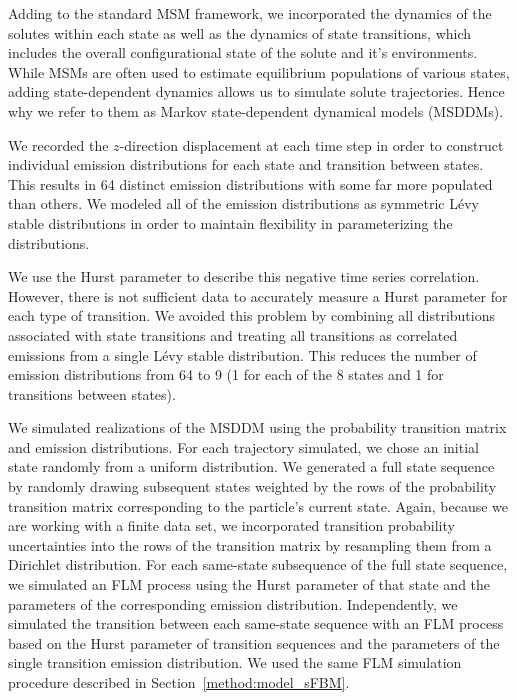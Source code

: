 \documentclass[aps,pre,preprint,groupedaddress,longbibliography]{revtex4-2}
\begin{document}
  Adding to the standard MSM framework, we incorporated the dynamics of the solutes
  within each state as well as the dynamics of state transitions, which includes the
  overall configurational state of the solute and it's environments. 
  While MSMs are often used to estimate equilibrium populations of various states, adding 
  state-dependent dynamics allows us to simulate solute trajectories.
  Hence why we refer to them as Markov state-dependent dynamical models (MSDDMs). 
  
  We recorded the $z$-direction displacement at each time step in order to construct 
  individual emission distributions for each state and transition between states. 
  This results in 64 distinct emission distributions with some far more populated than
  others. We modeled all of the emission distributions as symmetric L\'evy stable 
  distributions in order to maintain flexibility in parameterizing the distributions.
  
  We use the Hurst parameter to describe this negative time series correlation.
  However, there is not sufficient data to accurately measure a Hurst parameter for 
  each type of transition. We avoided this problem by combining all distributions 
  associated with state transitions and treating all transitions as correlated
  emissions from a single L\'evy stable distribution. This reduces the number of emission
  distributions from 64 to 9 (1 for each of the 8 states and 1 for transitions between states).  
  
  We simulated realizations of the MSDDM using the probability transition matrix and 
  emission distributions. For each trajectory simulated, we chose an initial state
  randomly from a uniform distribution. We generated a full state sequence by randomly
  drawing subsequent states weighted by the rows of the probability transition matrix
  corresponding to the particle's current state. Again, because we are working with a
  finite data set, we incorporated transition probability uncertainties into the rows
  of the transition matrix by resampling them from a Dirichlet distribution. For each 
  same-state subsequence of the full state sequence, we simulated an FLM process using
  the Hurst parameter of that state and the parameters of the corresponding emission
  distribution. Independently, we simulated the transition between each same-state 
  sequence with an FLM process based on the Hurst parameter of transition sequences 
  and the parameters of the single transition emission distribution. We used the same
  FLM simulation procedure described in Section~\ref{method:model_sFBM}.
\end{document}
